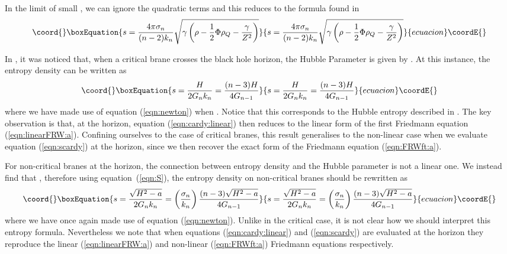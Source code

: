 \documentclass[a4paper,12pt]{article}
\begin{document}
In the limit of small \myHighlight{$\rho$}\coordHE{}, we can ignore the quadratic terms and
this reduces to the formula found in
\cite{Savonije:braneCFT,Cai:chargedcardy,Biswas:stiffmatter,Medved:holography}
\begin{equation}\coord{}\boxEquation{ \label{eqn:cardy:linear}
s =\frac{4\pi\sigma_n}{(n-2)k_n}
\sqrt{\gamma\left(\rho-\frac{1}{2}\Phi\rho_Q-\frac{\gamma}{Z^2}\right)}
}{ s =\frac{4\pi\sigma_n}{(n-2)k_n}
\sqrt{\gamma\left(\rho-\frac{1}{2}\Phi\rho_Q-\frac{\gamma}{Z^2}\right)}
}{ecuacion}\coordE{}\end{equation}

In \cite{Savonije:braneCFT}, it was noticed that, when a critical
brane \coordHE{} crosses the black hole horizon, the Hubble
Parameter is given by \coordHE{}. At this instance, the entropy
density can be written as
\begin{equation}\coord{}\boxEquation{ \label{eqn:entropy}
s=\frac{H}{2G_n k_n}=\frac{(n-3)H}{4G_{n-1}}
}{ s=\frac{H}{2G_n k_n}=\frac{(n-3)H}{4G_{n-1}}
}{ecuacion}\coordE{}\end{equation}
where we have made use of equation (\ref{eqn:newton}) when
\coordHE{}. Notice that this corresponds to the Hubble entropy
described in \cite{Verlinde:radiation}.  The key observation is that,
at the horizon, equation (\ref{eqn:cardy:linear}) then reduces to the
linear form of the first Friedmann equation (\ref{eqn:linearFRW:a}).
Confining ourselves to the case of critical branes, this result
generalises to the non-linear case when we evaluate equation
(\ref{eqn:scardy}) at the horizon, since we then recover the exact
form of the Friedmann equation (\ref{eqn:FRWft:a}).

For non-critical branes \coordHE{} at the horizon, the
connection between entropy density and the Hubble parameter is not a
linear one.  We instead find that \coordHE{}, therefore
using equation~(\ref{eqn:S}), the entropy density on non-critical
branes should be rewritten as
\begin{equation}\coord{}\boxEquation{ \label{eqn:s2}
s=\frac{\sqrt{H^2-a}}{2G_n k_n}=\left(\frac{\sigma_n}{k_n}
\right)\frac{(n-3)\sqrt{H^2-a}}{4 G_{n-1}}
}{ s=\frac{\sqrt{H^2-a}}{2G_n k_n}=\left(\frac{\sigma_n}{k_n}
\right)\frac{(n-3)\sqrt{H^2-a}}{4 G_{n-1}}
}{ecuacion}\coordE{}\end{equation}
where we have once again made use of equation
(\ref{eqn:newton}). Unlike in the critical case, it is not clear how
we should interpret this entropy formula. Nevertheless we note that
when equations (\ref{eqn:cardy:linear}) and (\ref{eqn:scardy}) are
evaluated at the horizon they reproduce the linear
(\ref{eqn:linearFRW:a}) and non-linear (\ref{eqn:FRWft:a}) Friedmann
equations respectively.
\end{document}
